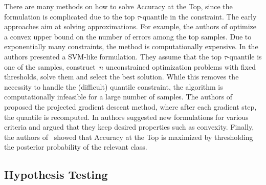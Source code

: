 There are many methods on how to solve Accuracy at the Top, since the formulation is complicated due to the top $\tau$-quantile in the constraint. The early approaches aim at solving approximations. For example, the authors of \cite{joachims2005svm} optimize a convex upper bound on the number of errors among the top samples. Due to exponentially many constraints, the method is computationally expensive. In \cite{boyd2012accuracy} the authors presented a SVM-like formulation. They assume that the top $\tau$-quantile is one of the samples, construct~$n$ unconstrained optimization problems with fixed thresholds, solve them and select the best solution. While this removes the necessity to handle the (difficult) quantile constraint, the algorithm is computationally infeasible for a large number of samples. The authors of~\cite{grill2016learning} proposed the projected gradient descent method, where after each gradient step, the quantile is recomputed. In \cite{eban2017scalable} authors suggested new formulations for various criteria and argued that they keep desired properties such as convexity. Finally, the authors of~\cite{tasche2018plug} showed that Accuracy at the Top is maximized by thresholding the posterior probability of the relevant class.

\subsection{Hypothesis Testing}

